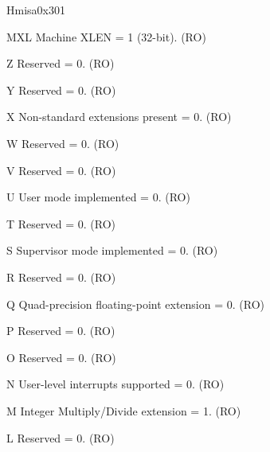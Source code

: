 \begin{register}{H}{misa}{0x301}\label{regdesc:LPMISA}
%
%
%
%
%
%
%
%
%
%
%
%
%
%
%
%
%
%
%
%
%
%
%
%
%
%
%
%
\regnewline%
\begin{regdesc}\begin{reglist}
\label{fielddesc:LPMISAMXL}\item [MXL] Machine XLEN = 1 (32-bit). (RO)
\label{fielddesc:LPMISAZ}\item [Z] Reserved = 0. (RO)
\label{fielddesc:LPMISAY}\item [Y] Reserved = 0. (RO)
\label{fielddesc:LPMISAX}\item [X] Non-standard extensions present = 0. (RO)
\label{fielddesc:LPMISAW}\item [W] Reserved = 0. (RO)
\label{fielddesc:LPMISAV}\item [V] Reserved = 0. (RO)
\label{fielddesc:LPMISAU}\item [U] User mode implemented = 0. (RO)
\label{fielddesc:LPMISAT}\item [T] Reserved = 0. (RO)
\label{fielddesc:LPMISAS}\item [S] Supervisor mode implemented = 0. (RO)
\label{fielddesc:LPMISAR}\item [R] Reserved = 0. (RO)
\label{fielddesc:LPMISAQ}\item [Q] Quad-precision floating-point extension = 0. (RO)
\label{fielddesc:LPMISAP}\item [P] Reserved = 0. (RO)
\label{fielddesc:LPMISAO}\item [O] Reserved = 0. (RO)
\label{fielddesc:LPMISAN}\item [N] User-level interrupts supported = 0. (RO)
\label{fielddesc:LPMISAM}\item [M] Integer Multiply/Divide extension = 1. (RO)
\label{fielddesc:LPMISAL}\item [L] Reserved = 0. (RO)

\end{reglist}
\end{regdesc}
\end{register}
